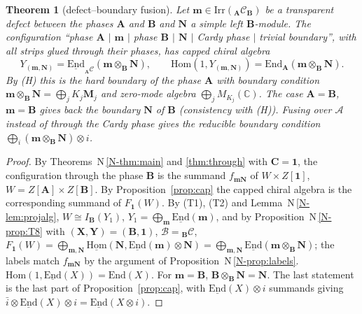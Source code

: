 \documentclass[11pt]{article}
\newtheorem{theorem}{Theorem}[section]
\theoremstyle{definition}
\theoremstyle{remark}
\newcommand{\cA}{\mathcal A}
\newcommand{\bfB}{\mathbf B}
\newcommand{\bfA}{\mathbf A}
\newcommand{\bfC}{\mathbf C}
\newcommand{\nref}[1]{N\,\ref{N-#1}}
\begin{document}
\begin{theorem}[defect--boundary fusion]\label{thm:bcft}
Let $\mathbf m\in\mathrm{Irr}({}_{\bfA}\mathcal C_{\bfB})$ be a transparent defect between the phases $\bfA$ and $\bfB$ and $\mathbf N$ a simple left $\bfB$-module. The configuration ``phase $\bfA$ $|$ $\mathbf m$ $|$ phase $\bfB$ $|$ $\mathbf N$ $|$ Cardy phase $|$ trivial boundary'', with all strips glued through their phases, has capped chiral algebra
\[
Y_{(\mathbf m,\mathbf N)}=\underline{\mathrm{End}}_{{}_{\bfA}\mathcal C}(\mathbf m\otimes_{\bfB}\mathbf N),\qquad\mathrm{Hom}(1,Y_{(\mathbf m,\mathbf N)})=\mathrm{End}_{\bfA}(\mathbf m\otimes_{\bfB}\mathbf N).
\]
By (H) this is the hard boundary of the phase $\bfA$ with boundary condition $\mathbf m\otimes_{\bfB}\mathbf N=\bigoplus_jK_j\mathbf M_j$ and zero-mode algebra $\bigoplus_jM_{K_j}(\mathbb C)$. The case $\bfA=\bfB$, $\mathbf m=\bfB$ gives back the boundary $\mathbf N$ of $\bfB$ (consistency with (H)). Fusing over $\cA$ instead of through the Cardy phase gives the reducible boundary condition $\bigoplus_i(\mathbf m\otimes_{\bfB}\mathbf N)\otimes i$.
\end{theorem}
\begin{proof}
By Theorems~\nref{thm:main} and \ref{thm:through} with $\bfC=\mathbf 1$, the configuration through the phase $\bfB$ is the summand $f_{\mathbf m\mathbf N}$ of $W\times Z[\mathbf 1]$, $W=Z[\bfA]\times Z[\bfB]$. By Proposition~\ref{prop:cap} the capped chiral algebra is the corresponding summand of $F_{\mathbf 1}(W)$. By (T1), (T2) and Lemma~\nref{lem:projalg}, $W\cong I_{\bfB}(Y_1)$, $Y_1=\bigoplus_{\mathbf m}\underline{\mathrm{End}}(\mathbf m)$, and by Proposition~\nref{prop:T8} with $(\mathbf X,\mathbf Y)=(\bfB,\mathbf 1)$, $\mathcal B={}_{\bfB}\mathcal C$, $F_{\mathbf 1}(W)=\bigoplus_{\mathbf m,\mathbf N}\underline{\mathrm{Hom}}(\mathbf N,\underline{\mathrm{End}}(\mathbf m)\otimes\mathbf N)=\bigoplus_{\mathbf m,\mathbf N}\underline{\mathrm{End}}(\mathbf m\otimes_{\bfB}\mathbf N)$; the labels match $f_{\mathbf m\mathbf N}$ by the argument of Proposition~\nref{prop:labels}. $\mathrm{Hom}(1,\underline{\mathrm{End}}(X))=\mathrm{End}(X)$. For $\mathbf m=\bfB$, $\bfB\otimes_{\bfB}\mathbf N=\mathbf N$. The last statement is the last part of Proposition~\ref{prop:cap}, with $\underline{\mathrm{End}}(X)\otimes i$ summands giving $\bar i\otimes\underline{\mathrm{End}}(X)\otimes i=\underline{\mathrm{End}}(X\otimes i)$.
\end{proof}
\end{document}
